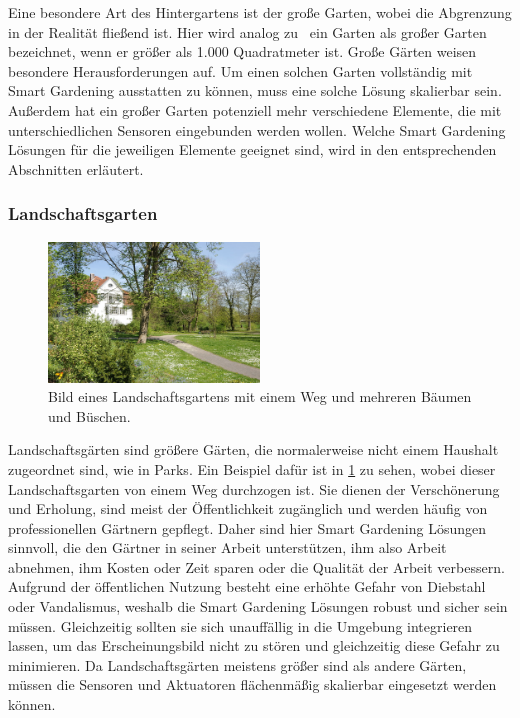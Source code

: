 
Eine besondere Art des Hintergartens ist der große Garten, wobei die Abgrenzung in der Realität fließend ist.
Hier wird analog zu~\cite{grosserGarten} ein Garten als großer Garten bezeichnet, wenn er größer als 1.000 Quadratmeter ist.
Große Gärten weisen besondere Herausforderungen auf.
Um einen solchen Garten vollständig mit Smart Gardening ausstatten zu können, muss eine solche Lösung skalierbar sein.
Außerdem hat ein großer Garten potenziell mehr verschiedene Elemente, die mit unterschiedlichen Sensoren eingebunden werden wollen.
Welche Smart Gardening Lösungen für die jeweiligen Elemente geeignet sind, wird in den entsprechenden Abschnitten erläutert.

\subsubsection{Landschaftsgarten}
\begin{figure}[!htb]
	\centering
	\includegraphics[width=0.5\textwidth]{images/Landschaftsgarten.jpg}
	\caption[Bild eines Landschaftsgartens mit einem Weg, Bäumen und Büschen.]{
		Bild eines Landschaftsgartens mit einem Weg und mehreren Bäumen und Büschen.\footnotemark
	}
	\label{pic:landschaftsgarten}
\end{figure}

Landschaftsgärten sind größere Gärten, die normalerweise nicht einem Haushalt zugeordnet sind, wie in Parks.
Ein Beispiel dafür ist in \cref{pic:landschaftsgarten} zu sehen, wobei dieser Landschaftsgarten von einem Weg durchzogen ist.
Sie dienen der Verschönerung und Erholung, sind meist der Öffentlichkeit zugänglich und werden häufig von professionellen Gärtnern gepflegt.
Daher sind hier Smart Gardening Lösungen sinnvoll, die den Gärtner in seiner Arbeit unterstützen, ihm also Arbeit abnehmen, ihm Kosten oder Zeit sparen oder die Qualität der Arbeit verbessern.
Aufgrund der öffentlichen Nutzung besteht eine erhöhte Gefahr von Diebstahl oder Vandalismus, weshalb die Smart Gardening Lösungen robust und sicher sein müssen.
Gleichzeitig sollten sie sich unauffällig in die Umgebung integrieren lassen, um das Erscheinungsbild nicht zu stören und gleichzeitig diese Gefahr zu minimieren.
Da Landschaftsgärten meistens größer sind als andere Gärten, müssen die Sensoren und Aktuatoren flächenmäßig skalierbar eingesetzt werden können.


